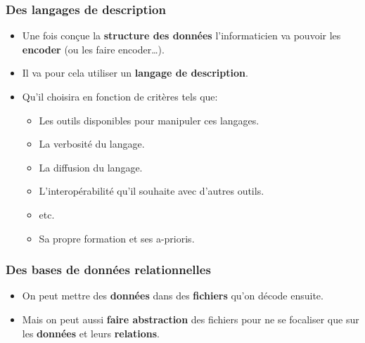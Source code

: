 \subsubsection{Des langages de description}

\begin{slide}
  \begin{itemize}
    \item Une fois conçue la \textbf{structure des données} l'informaticien va pouvoir les \textbf{encoder} (ou les faire encoder…).
    \item Il va pour cela utiliser un \textbf{langage de description}.
    \item Qu'il choisira en fonction de critères tels que:
      \begin{itemize}
	\item Les outils disponibles pour manipuler ces langages.
	\item La verbosité du langage.
	\item La diffusion du langage.
	\item L'interopérabilité qu'il souhaite avec d'autres outils.
	\item etc.
	\item Sa propre formation et ses a-prioris.
      \end{itemize}
  \end{itemize}
\end{slide}

\begin{slide}

		\beamerdefaultoverlayspecification{}

		

\end{slide}

\subsubsection{Des bases de données relationnelles}
\begin{slide}
	\begin{itemize}
		\item On peut mettre des \textbf{données} dans des \textbf{fichiers} qu'on décode ensuite.
		\item Mais on peut aussi \textbf{faire abstraction} des fichiers pour ne se focaliser que sur les \textbf{données} et leurs \textbf{relations}.
	\end{itemize}
\end{slide}

